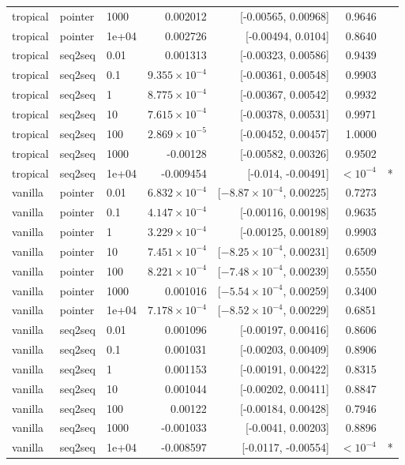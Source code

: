 \documentclass[10pt]{article}
\begin{document}
{\begin{longtable}{lllrrrl}
tropical & pointer & 1000 & 0.002012 & [-0.00565, 0.00968] & 0.9646 & \\
tropical & pointer & 1e+04 & 0.002726 & [-0.00494, 0.0104] & 0.8640 & \\
tropical & seq2seq & 0.01 & 0.001313 & [-0.00323, 0.00586] & 0.9439 & \\
tropical & seq2seq & 0.1 & $9.355\times10^{-4}$ & [-0.00361, 0.00548] & 0.9903 & \\
tropical & seq2seq & 1 & $8.775\times10^{-4}$ & [-0.00367, 0.00542] & 0.9932 & \\
tropical & seq2seq & 10 & $7.615\times10^{-4}$ & [-0.00378, 0.00531] & 0.9971 & \\
tropical & seq2seq & 100 & $2.869\times10^{-5}$ & [-0.00452, 0.00457] & 1.0000 & \\
tropical & seq2seq & 1000 & -0.00128 & [-0.00582, 0.00326] & 0.9502 & \\
tropical & seq2seq & 1e+04 & -0.009454 & [-0.014, -0.00491] & $<10^{-4}$ & *\\
vanilla & pointer & 0.01 & $6.832\times10^{-4}$ & [$-8.87\times10^{-4}$, 0.00225] & 0.7273 & \\
vanilla & pointer & 0.1 & $4.147\times10^{-4}$ & [-0.00116, 0.00198] & 0.9635 & \\
vanilla & pointer & 1 & $3.229\times10^{-4}$ & [-0.00125, 0.00189] & 0.9903 & \\
vanilla & pointer & 10 & $7.451\times10^{-4}$ & [$-8.25\times10^{-4}$, 0.00231] & 0.6509 & \\
vanilla & pointer & 100 & $8.221\times10^{-4}$ & [$-7.48\times10^{-4}$, 0.00239] & 0.5550 & \\
vanilla & pointer & 1000 & 0.001016 & [$-5.54\times10^{-4}$, 0.00259] & 0.3400 & \\
vanilla & pointer & 1e+04 & $7.178\times10^{-4}$ & [$-8.52\times10^{-4}$, 0.00229] & 0.6851 & \\
vanilla & seq2seq & 0.01 & 0.001096 & [-0.00197, 0.00416] & 0.8606 & \\
vanilla & seq2seq & 0.1 & 0.001031 & [-0.00203, 0.00409] & 0.8906 & \\
vanilla & seq2seq & 1 & 0.001153 & [-0.00191, 0.00422] & 0.8315 & \\
vanilla & seq2seq & 10 & 0.001044 & [-0.00202, 0.00411] & 0.8847 & \\
vanilla & seq2seq & 100 & 0.00122 & [-0.00184, 0.00428] & 0.7946 & \\
vanilla & seq2seq & 1000 & -0.001033 & [-0.0041, 0.00203] & 0.8896 & \\
vanilla & seq2seq & 1e+04 & -0.008597 & [-0.0117, -0.00554] & $<10^{-4}$ & *\\
\bottomrule
\end{longtable}
}
\end{document}
